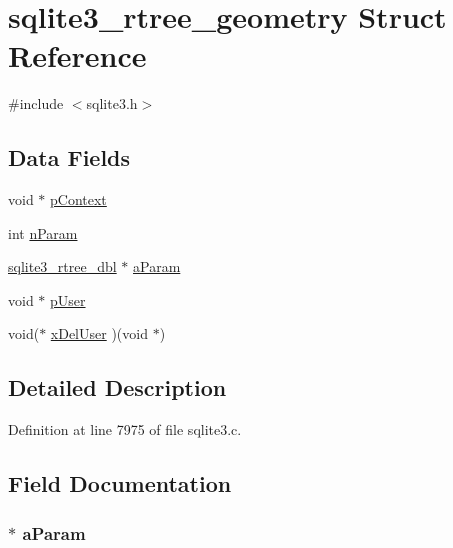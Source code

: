 \hypertarget{structsqlite3__rtree__geometry}{}\section{sqlite3\+\_\+rtree\+\_\+geometry Struct Reference}
\label{structsqlite3__rtree__geometry}


{\ttfamily \#include $<$sqlite3.\+h$>$}

\subsection*{Data Fields}
\begin{DoxyCompactItemize}
\item 
void $\ast$ \hyperlink{structsqlite3__rtree__geometry_a421c653f7747c70d1e422f06b75e7f53}{p\+Context}
\item 
int \hyperlink{structsqlite3__rtree__geometry_ab3346bd10d8072caf8ec019ceeb3224e}{n\+Param}
\item 
\hyperlink{sqlite3_8c_ae9156ff58620c1ceae9391f1afabae1b}{sqlite3\+\_\+rtree\+\_\+dbl} $\ast$ \hyperlink{structsqlite3__rtree__geometry_ad8bcfe2630b76222947d6d78f4657a93}{a\+Param}
\item 
void $\ast$ \hyperlink{structsqlite3__rtree__geometry_a6ffcfefabc1d53128f66ef895058a6e2}{p\+User}
\item 
void($\ast$ \hyperlink{structsqlite3__rtree__geometry_aa90fafba5714bc276f69c04adae44256}{x\+Del\+User} )(void $\ast$)
\end{DoxyCompactItemize}


\subsection{Detailed Description}


Definition at line 7975 of file sqlite3.\+c.



\subsection{Field Documentation}
\hypertarget{structsqlite3__rtree__geometry_ad8bcfe2630b76222947d6d78f4657a93}{}
\subsubsection[{a\+Param}]{ $\ast$ a\+Param}\label{structsqlite3__rtree__geometry_ad8bcfe2630b76222947d6d78f4657a93}



